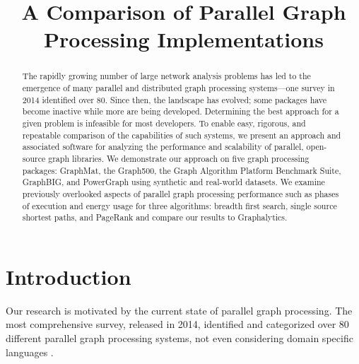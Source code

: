 \documentclass[conference]{IEEEtran}
\begin{document}
\title{A Comparison of Parallel Graph Processing Implementations}
\author{
	\and
}
\maketitle
\begin{abstract}
The rapidly growing number of large network analysis problems has led to the emergence of many parallel and distributed graph processing systems---one survey in 2014 identified over 80. Since then, the landscape has evolved; some packages have become inactive while more are being developed. Determining the best approach for a given problem is infeasible for most developers. To enable easy, rigorous, and repeatable comparison of the capabilities of such systems, we present an approach and associated software for analyzing the performance and scalability of parallel, open-source graph libraries. We demonstrate our approach on five graph processing packages: GraphMat, the Graph500, the Graph Algorithm Platform Benchmark Suite, GraphBIG, and PowerGraph using synthetic and real-world datasets. We examine previously overlooked aspects of parallel graph processing performance such as phases of execution and energy usage for three algorithms: breadth first search, single source shortest paths, and PageRank and compare our results to Graphalytics.
\end{abstract}

\section{Introduction}
Our research is motivated by the current state of parallel graph processing. The most comprehensive survey, released in 2014, identified and categorized over 80 different parallel graph processing systems, not even considering domain specific languages \cite{Doekemeijer:2015:GPFSurvey}.
\end{document}
